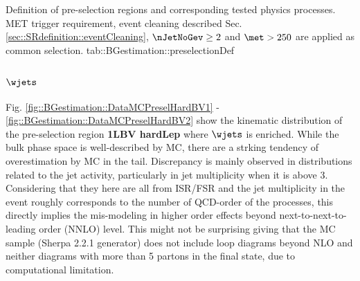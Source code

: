 {Definition of pre-selection regions and corresponding tested physics processes. MET trigger requirement, event cleaning described Sec. \ref{sec::SRdefinition::eventCleaning}, $\nJetNoGev \geq 2$ and $\met>250$ are applied as common selection.}
{tab::BGestimation::preselectionDef}

\subsubsection{$\wjets$}
Fig. \ref{fig::BGestimation::DataMCPreselHardBV1} - \ref{fig::BGestimation::DataMCPreselHardBV2} show the kinematic distribution of the pre-selection region \textbf{1LBV hardLep} where $\wjets$ is enriched. While the bulk phase space is well-described by MC, there are a strking tendency of overestimation by MC in the tail. Discrepancy is mainly observed in distributions related to the jet activity, particularly in jet multiplicity when it is above 3. Considering that they here are all from ISR/FSR and the jet multiplicity in the event roughly corresponds to the number of QCD-order of the processes, this directly implies the mis-modeling in higher order effects beyond next-to-next-to-leading order (NNLO) level. This might not be surprising giving that the MC sample (Sherpa 2.2.1 generator) does not include loop diagrams beyond NLO and neither diagrams with more than 5 partons in the final state, due to computational limitation. \\

